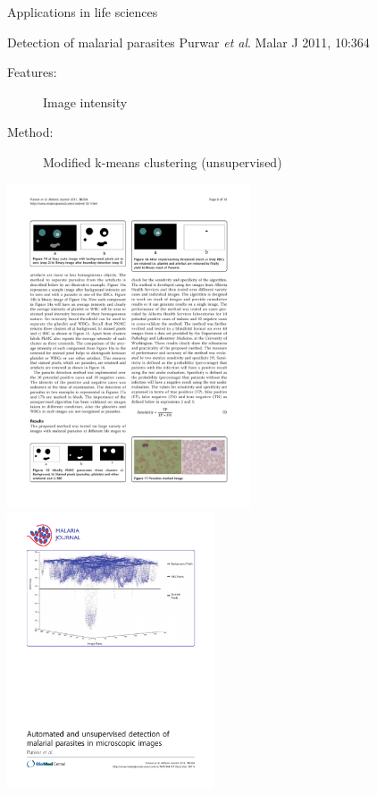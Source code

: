 \documentclass[pdf]{beamer}
\begin{document}
\begin{frame}{Applications in life sciences}
\begin{exampleblock}{Detection of malarial parasites \vskip-1mm{\tiny Purwar \textit{et al}. Malar J 2011, 10:364}}
\begin{description}
	\item[Features:] Image intensity
	\item[Method:] Modified k-means clustering (unsupervised)
\end{description}
\begin{center}
	\includegraphics[width=0.54\textwidth]{purwar02.pdf}
	\includegraphics[width=0.46\textwidth]{purwar01.pdf}
\end{center}
\end{exampleblock}
\end{frame}
\end{document}
